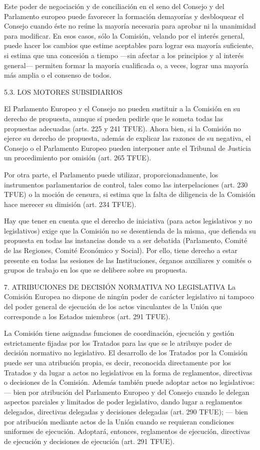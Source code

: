 \documentclass[10pt,a4paper]{article}
\begin{document}
Este poder de negociación y de conciliación en el seno del Consejo y del Parlamento europeo puede favorecer la formación demayorías y desbloquear el Consejo cuando éste no reúne la mayoría necesaria para aprobar ni la unanimidad para modificar. En esos casos, sólo la Comisión, velando por el interés general, puede hacer los cambios que estime aceptables para lograr esa mayoría  suficiente, si estima que una concesión a tiempo —sin afectar a los principios y al interés general— permiten formar la mayoría cualificada o, a veces, lograr una mayoría más amplia o el consenso de todos.

5.3. LOS MOTORES SUBSIDIARIOS

El Parlamento Europeo y el Consejo no pueden sustituir a la Comisión en su derecho de propuesta, aunque sí pueden pedirle que le someta todas las propuestas adecuadas (arts. 225 y 241 TFUE). Ahora bien, si la Comisión no ejerce su derecho de propuesta, además de explicar las razones de su negativa, el Consejo o el Parlamento Europeo pueden interponer ante el Tribunal de Justicia un procedimiento por omisión (art. 265 TFUE).

Por otra parte, el Parlamento puede utilizar, proporcionadamente, los instrumentos parlamentarios de control, tales como las interpelaciones (art. 230 TFUE) o la moción de censura, si estima que la falta de diligencia de la Comisión hace merecer su dimisión (art. 234 TFUE).

Hay que tener en cuenta que el derecho de iniciativa (para actos legislativos y no legislativos) exige que la Comisión no se desentienda de la misma, que defienda su propuesta en todas las instancias donde va a ser debatida (Parlamento, Comité de las Regiones, Comité Económico y Social). Por ello, tiene derecho a estar presente en todas las sesiones de las Instituciones, órganos auxiliares y comités o grupos de trabajo en los que se delibere sobre su propuesta.


7. ATRIBUCIONES DE DECISIÓN NORMATIVA NO
LEGISLATIVA
La Comisión Europea no dispone de ningún poder de carácter legislativo ni tampoco del poder general de ejecución de los actos vinculantes de la Unión que corresponde a los Estados miembros (art. 291 TFUE).

La Comisión tiene asignadas funciones de coordinación, ejecución y gestión estrictamente fijadas por los Tratados para las que se le atribuye poder de decisión normativo no legislativo. El desarrollo de los Tratados por la Comisión puede ser una atribución propia, es decir, reconocida directamente por los Tratados y da lugar a actos no legislativos en la forma de reglamentos, directivas o decisiones de la Comisión. Además también puede adoptar actos no legislativos: — bien por atribución del Parlamento Europeo y del Consejo cuando le delegan aspectos parciales y limitados de poder legislativo, dando lugar a reglamentos delegados, directivas delegadas y decisiones delegadas (art. 290 TFUE); — bien por atribución mediante actos de la Unión cuando se requieran condiciones uniformes de ejecución. Adoptará, entonces, reglamentos de ejecución, directivas de ejecución y decisiones de ejecución (art. 291 TFUE).
\end{document}
